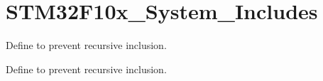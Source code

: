 \hypertarget{group___s_t_m32_f10x___system___includes}{\section{S\-T\-M32\-F10x\-\_\-\-System\-\_\-\-Includes}
\label{group___s_t_m32_f10x___system___includes}
}


Define to prevent recursive inclusion.  


Define to prevent recursive inclusion. 